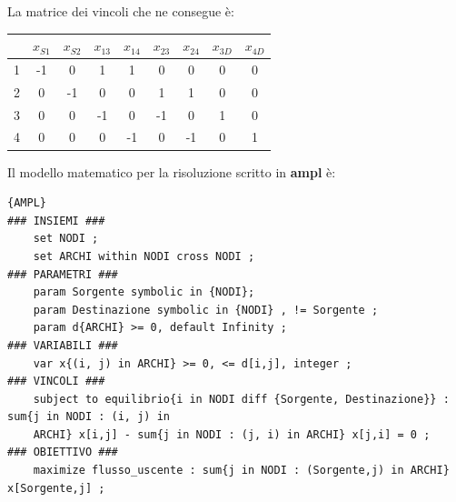 La matrice dei vincoli che ne consegue è:
\begin{table}[!ht]
	\begin{adjustbox}{width=0.4\columnwidth, center}
    \begin{tabular}{|c|c|c|c|c|c|c|c|c|}
      \hline
      & $x_{S1}$ & $x_{S2}$ & $x_{13}$ & $x_{14}$ & $x_{23}$ & $x_{24}$ & $x_{3D}$ & $x_{4D}$ \\
      \hline
      1 & -1       & 0        & 1        & 1        & 0        & 0        & 0        & 0        \\
      2 & 0        & -1       & 0        & 0        & 1        & 1        & 0        & 0        \\
      3 & 0        & 0        & -1       & 0        & -1       & 0        & 1        & 0        \\
      4 & 0        & 0        & 0        & -1       & 0        & -1       & 0        & 1        \\
      \hline
    \end{tabular}
	\end{adjustbox}
\end{table}

Il modello matematico per la risoluzione scritto in \textbf{ampl} è:
\begin{lstlisting}{AMPL}
### INSIEMI ###
    set NODI ;
    set ARCHI within NODI cross NODI ;
### PARAMETRI ###
    param Sorgente symbolic in {NODI};
    param Destinazione symbolic in {NODI} , != Sorgente ;
    param d{ARCHI} >= 0, default Infinity ;
### VARIABILI ###
    var x{(i, j) in ARCHI} >= 0, <= d[i,j], integer ;
### VINCOLI ###
    subject to equilibrio{i in NODI diff {Sorgente, Destinazione}} : sum{j in NODI : (i, j) in
    ARCHI} x[i,j] - sum{j in NODI : (j, i) in ARCHI} x[j,i] = 0 ;
### OBIETTIVO ###
    maximize flusso_uscente : sum{j in NODI : (Sorgente,j) in ARCHI} x[Sorgente,j] ;
\end{lstlisting}


